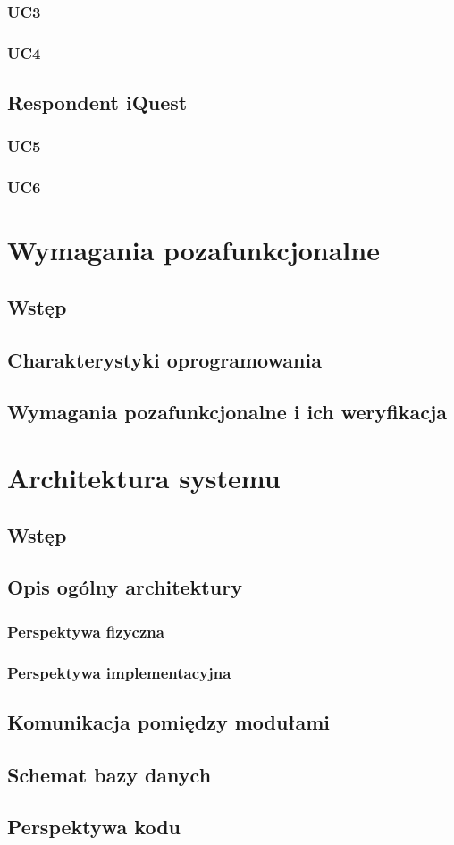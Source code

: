 \subsection{UC3}
\subsection{UC4}
\section{Respondent iQuest}
\subsection{UC5}
\subsection{UC6}

\chapter{Wymagania pozafunkcjonalne}
\section{Wstęp}
\section{Charakterystyki oprogramowania}
\section{Wymagania pozafunkcjonalne i ich weryfikacja}

\chapter{Architektura systemu}
\section{Wstęp}
\section{Opis ogólny architektury}
\subsection{Perspektywa fizyczna}
\subsection{Perspektywa implementacyjna}
\section{Komunikacja pomiędzy modułami}
\section{Schemat bazy danych}
\section{Perspektywa kodu}